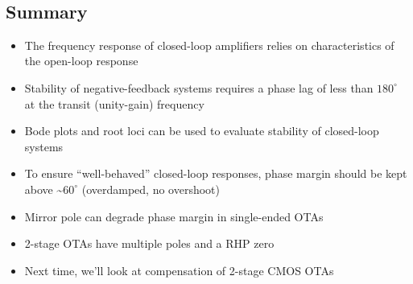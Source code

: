 \documentclass[11pt]{article}
\providecommand{\tightlist}{%
      \setlength{\itemsep}{0pt}\setlength{\parskip}{0pt}}
\begin{document}
    \begin{center}
    \end{center}
    { \hspace*{\fill} \\}
    
    \hypertarget{summary}{%
\subsection{Summary}\label{summary}}

    \begin{itemize}
\tightlist
\item
  The frequency response of closed-loop amplifiers relies on
  characteristics of the open-loop response
\item
  Stability of negative-feedback systems requires a phase lag of less
  than \(180^{\circ}\) at the transit (unity-gain) frequency
\item
  Bode plots and root loci can be used to evaluate stability of
  closed-loop systems
\item
  To ensure ``well-behaved'' closed-loop responses, phase margin should
  be kept above \textasciitilde{}\(60^{\circ}\) (overdamped, no
  overshoot)
\item
  Mirror pole can degrade phase margin in single-ended OTAs
\item
  2-stage OTAs have multiple poles and a RHP zero
\item
  Next time, we'll look at compensation of 2-stage CMOS OTAs
\end{itemize}


    
    
    
\end{document}
